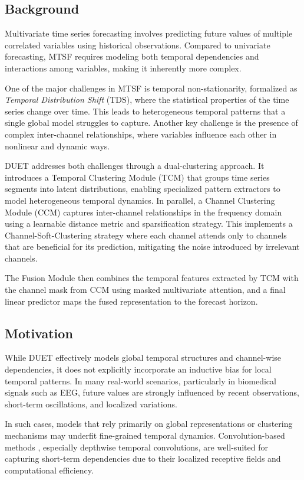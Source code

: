 \documentclass[conference]{IEEEtran}
\begin{document}
\subsection{Background}

Multivariate time series forecasting involves predicting future values of multiple correlated variables using historical observations. Compared to univariate forecasting, MTSF requires modeling both temporal dependencies and interactions among variables, making it inherently more complex.

One of the major challenges in MTSF is temporal non-stationarity, formalized as \textit{Temporal Distribution Shift} (TDS), where the statistical properties of the time series change over time. This leads to heterogeneous temporal patterns that a single global model struggles to capture. Another key challenge is the presence of complex inter-channel relationships, where variables influence each other in nonlinear and dynamic ways.

DUET addresses both challenges through a dual-clustering approach. It introduces a Temporal Clustering Module (TCM) that groups time series segments into latent distributions, enabling specialized pattern extractors to model heterogeneous temporal dynamics. In parallel, a Channel Clustering Module (CCM) captures inter-channel relationships in the frequency domain using a learnable distance metric and sparsification strategy. This implements a Channel-Soft-Clustering strategy where each channel attends only to channels that are beneficial for its prediction, mitigating the noise introduced by irrelevant channels.

The Fusion Module then combines the temporal features extracted by TCM with the channel mask from CCM using masked multivariate attention, and a final linear predictor maps the fused representation to the forecast horizon.

\subsection{Motivation}
While DUET effectively models global temporal structures and channel-wise dependencies, it does not explicitly incorporate an inductive bias for local temporal patterns. In many real-world scenarios, particularly in biomedical signals such as EEG, future values are strongly influenced by recent observations, short-term oscillations, and localized variations.

In such cases, models that rely primarily on global representations or clustering mechanisms may underfit fine-grained temporal dynamics. Convolution-based methods \cite{timesnet}, especially depthwise temporal convolutions, are well-suited for capturing short-term dependencies due to their localized receptive fields and computational efficiency.
\end{document}
